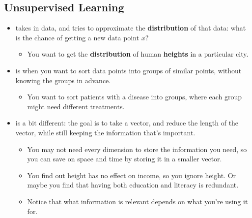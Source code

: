     
    \subsection{Unsupervised Learning}
    
        \begin{itemize}
            \item {} takes in data, and tries to approximate the \textbf{distribution} of that data: what is the chance of getting a new data point $x$? 
                \begin{itemize}
                    \item \miniex You want to get the \textbf{distribution} of human \textbf{heights} in a particular city.
                \end{itemize}
                
            \item {} is when you want to sort data points into groups of similar points, without knowing the groups in advance.
                \begin{itemize}
                    \item \miniex You want to sort patients with a disease into groups, where each group might need different treatments.
                \end{itemize}
                
            \item {} is a bit different: the goal is to take a vector, and reduce the length of the vector, while still keeping the information that's important.
                \begin{itemize}
                    \item You may not need every dimension to store the information you need, so you can save on space and time by storing it in a smaller vector.
                    \item \miniex You find out height has no effect on income, so you ignore height. Or maybe you find that having both education and literacy is redundant.
                    \item Notice that what information is relevant depends on what you're using it for.
                \end{itemize}
        \end{itemize}
    
